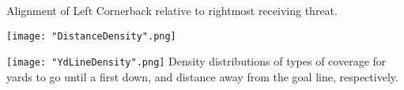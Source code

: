 \documentclass{article}
\begin{document}
    

Alignment of Left Cornerback relative to rightmost receiving threat. 

\texttt{[image: "DistanceDensity".png]}


\texttt{[image: "YdLineDensity".png]}
Density distributions of types of coverage for yards to go until a first down, and distance away from the goal line, respectively. 
\end{document}
